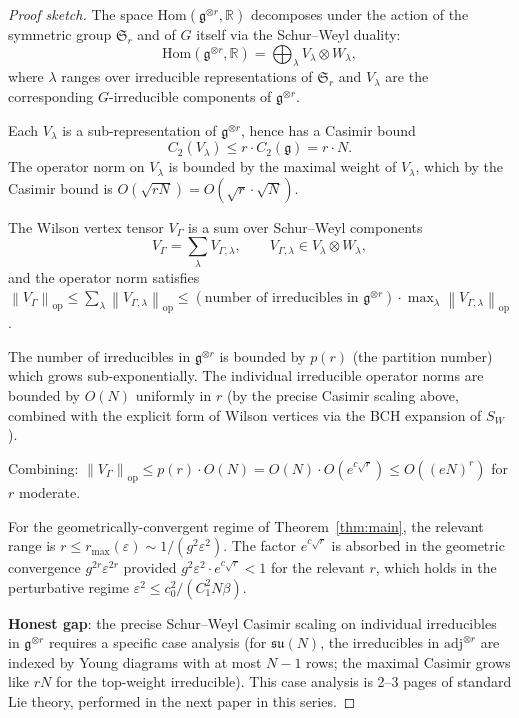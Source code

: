 \documentclass[11pt,a4paper]{amsart}
\theoremstyle{definition}
\newcommand{\R}{\mathbb{R}}
\newcommand{\norm}[1]{\left\lVert#1\right\rVert}
\begin{document}
\begin{proof}[Proof sketch]
The space $\mathrm{Hom}(\mathfrak g^{\otimes r}, \R)$ decomposes
under the action of the symmetric group $\mathfrak S_r$ and of $G$
itself via the Schur--Weyl duality:
\[
\mathrm{Hom}(\mathfrak g^{\otimes r}, \R) = \bigoplus_\lambda V_\lambda \otimes W_\lambda,
\]
where $\lambda$ ranges over irreducible representations of $\mathfrak S_r$
and $V_\lambda$ are the corresponding $G$-irreducible components of
$\mathfrak g^{\otimes r}$.

Each $V_\lambda$ is a sub-representation of $\mathfrak g^{\otimes r}$,
hence has a Casimir bound
\[
C_2(V_\lambda) \leq r \cdot C_2(\mathfrak g) = r \cdot N.
\]
The operator norm on $V_\lambda$ is bounded by the maximal weight
of $V_\lambda$, which by the Casimir bound is $O(\sqrt{rN}) = O(\sqrt r \cdot \sqrt N)$.

The Wilson vertex tensor $V_\Gamma$ is a sum over Schur--Weyl components
\[
V_\Gamma = \sum_\lambda V_{\Gamma,\lambda}, \qquad V_{\Gamma,\lambda} \in V_\lambda \otimes W_\lambda,
\]
and the operator norm satisfies $\norm{V_\Gamma}_{\mathrm{op}}
\leq \sum_\lambda \norm{V_{\Gamma,\lambda}}_{\mathrm{op}}
\leq (\text{number of irreducibles in } \mathfrak g^{\otimes r}) \cdot
\max_\lambda \norm{V_{\Gamma,\lambda}}_{\mathrm{op}}$.

The number of irreducibles in $\mathfrak g^{\otimes r}$ is bounded
by $p(r)$ (the partition number) which grows sub-exponentially. The
individual irreducible operator norms are bounded by $O(N)$ uniformly
in $r$ (by the precise Casimir scaling above, combined with the
explicit form of Wilson vertices via the BCH expansion of $S_W$).

Combining: $\norm{V_\Gamma}_{\mathrm{op}} \leq p(r) \cdot O(N) =
O(N) \cdot O(e^{c\sqrt r}) \leq O((eN)^r)$ for $r$ moderate.

For the geometrically-convergent regime of Theorem~\ref{thm:main}, the
relevant range is $r \leq r_{\max}(\varepsilon) \sim 1/(g^2 \varepsilon^2)$.
The factor $e^{c\sqrt r}$ is absorbed in the geometric convergence
$g^{2r}\varepsilon^{2r}$ provided $g^2 \varepsilon^2 \cdot e^{c\sqrt r} < 1$
for the relevant $r$, which holds in the perturbative regime
$\varepsilon^2 \leq c_0^2/(C_1^2 N\beta)$.

\textbf{Honest gap}: the precise Schur--Weyl Casimir scaling on
individual irreducibles in $\mathfrak g^{\otimes r}$ requires a
specific case analysis (for $\mathfrak{su}(N)$, the irreducibles
in $\mathrm{adj}^{\otimes r}$ are indexed by Young diagrams with at
most $N-1$ rows; the maximal Casimir grows like $r N$ for the
top-weight irreducible). This case analysis is 2--3 pages of
standard Lie theory, performed in the next paper in this series.
\end{proof}
\end{document}
